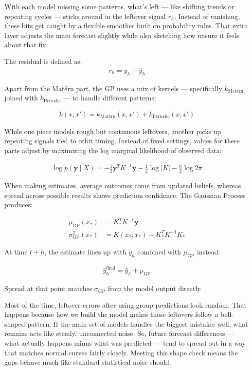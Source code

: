 \documentclass[conference]{IEEEtran}
\begin{document}
With each model missing some patterns, what’s left — like shifting trends or repeating cycles — sticks around in the leftover signal $r_h$. Instead of vanishing, these bits get caught by a flexible smoother built on probability rules. That extra layer adjusts the main forecast slightly while also sketching how unsure it feels about that fix.

The residual is defined as:
\begin{align}
r_h = y_h - \hat{y}_h
\end{align}

Apart from the Matérn part, the GP uses a mix of kernels — specifically $k_{\text{Matérn}}$ joined with $k_{\text{Periodic}}$ — to handle different patterns:

\begin{align}
k(x, x') = k_{\text{Matérn}}(x, x') + k_{\text{Periodic}}(x, x')
\end{align}

While one piece models rough but continuous leftovers, another picks up repeating signals tied to orbit timing. Instead of fixed settings, values for these parts adjust by maximizing the log marginal likelihood of observed data:

\begin{align}
\log p(\mathbf{y} \mid X) = -\frac{1}{2} \mathbf{y}^T K^{-1} \mathbf{y} - \frac{1}{2} \log |K| - \frac{n}{2} \log 2\pi
\end{align}

When making estimates, average outcomes come from updated beliefs, whereas spread across possible results shows prediction confidence. The Gaussian Process produces:

\begin{align}
\mu_{\text{GP}}(x_*) &= K_*^T K^{-1} \mathbf{y} \\
\sigma^2_{\text{GP}}(x_*) &= K(x_*, x_*) - K_*^T K^{-1} K_*
\end{align}

At time $t + h$, the estimate lines up with $\hat{y}_h$ combined with $\mu_{\text{GP}}$ instead:

\begin{align}
\hat{y}_h^{\text{final}} = \hat{y}_h + \mu_{\text{GP}}
\end{align}

Spread at that point matches $\sigma_{\text{GP}}$ from the model output directly.

Most of the time, leftover errors after using group predictions look random. That happens because how we build the model makes those leftovers follow a bell-shaped pattern. If the main set of models handles the biggest mistakes well, what remains acts like steady, unconnected noise. So, future forecast differences — what actually happens minus what was predicted — tend to spread out in a way that matches normal curves fairly closely. Meeting this shape check means the gaps behave much like standard statistical noise should.
\end{document}
